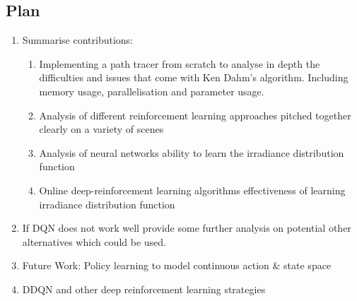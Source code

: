 \documentclass[ %
                    author={Callum Pearce},
                supervisor={Dr. Neill Campbell},
                    degree={MEng},
                     title={How effective are Temporal difference learning methods for reducing the number of zero contribution light paths, while still accurately approximating Global Illumination in Path tracing?},
                  subtitle={},
                      type={research},
                      year={2019} ]{dissertation}
\begin{document}
\subsection{Plan}
\begin{enumerate}
\item Summarise contributions:

\begin{enumerate}
\item Implementing a path tracer from scratch to analyse in depth the difficulties and issues that come with Ken Dahm's algorithm. Including memory usage, parallelisation and parameter usage.

\item Analysis of different reinforcement learning approaches pitched together clearly on a variety of scenes

\item Analysis of neural networks ability to learn the irradiance distribution function

\item Online deep-reinforcement learning algorithms effectiveness of learning irradiance distribution function
\end{enumerate}

\item If DQN does not work well provide some further analysis on potential other alternatives which could be used.

\item Future Work: Policy learning to model continuous action \& state space

\item DDQN and other deep reinforcement learning strategies
\end{enumerate}


%
%
\end{document}
